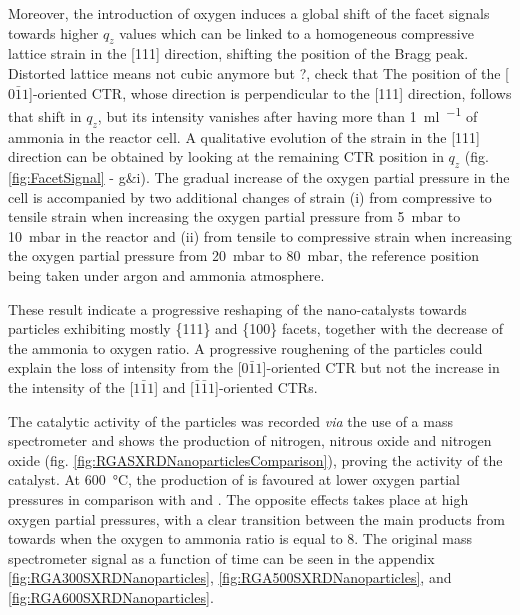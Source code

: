 Moreover, the introduction of oxygen induces a global shift of the facet signals towards higher $q_z$ values which can be linked to a homogeneous compressive lattice strain in the [111] direction, shifting the position of the Bragg peak.
\textcolor{Important}{Distorted lattice means not cubic anymore but ?, check that}
The position of the [$0\bar{1}1$]-oriented CTR, whose direction is perpendicular to the [111] direction, follows that shift in $q_z$, but its intensity vanishes after having more than \qty{1}{\ml\per\min} of ammonia in the reactor cell.
A qualitative evolution of the strain in the [111] direction can be obtained by looking at the remaining CTR position in $q_z$ (fig. \ref{fig:FacetSignal} - g\&i).
The gradual increase of the oxygen partial pressure in the cell is accompanied by two additional changes of strain (i) from compressive to tensile strain when increasing the oxygen partial pressure from \qty{5}{\milli\bar} to \qty{10}{\milli\bar} in the reactor and (ii) from tensile to compressive strain when increasing the oxygen partial pressure from \qty{20}{\milli\bar} to \qty{80}{\milli\bar}, the reference position being taken under argon and ammonia atmosphere.

These result indicate a progressive reshaping of the nano-catalysts towards particles exhibiting mostly \{111\} and \{100\} facets, together with the decrease of the ammonia to oxygen ratio.
A progressive roughening of the particles could explain the loss of intensity from the [$0\bar{1}1$]-oriented CTR but not the increase in the intensity of the [$1\bar{1}1$] and [$\bar{1}\bar{1}1$]-oriented CTRs.

The catalytic activity of the particles was recorded \textit{via} the use of a mass spectrometer and shows the production of nitrogen, nitrous oxide and nitrogen oxide (fig. \ref{fig:RGASXRDNanoparticlesComparison}), proving the activity of the catalyst.
At \qty{600}{\degreeCelsius}, the production of  is favoured at lower oxygen partial pressures in comparison with  and .
The opposite effects takes place at high oxygen partial pressures, with a clear transition between the main products from  towards  when the oxygen to ammonia ratio is equal to 8.
The original mass spectrometer signal as a function of time can be seen in the appendix \ref{fig:RGA300SXRDNanoparticles}, \ref{fig:RGA500SXRDNanoparticles}, and \ref{fig:RGA600SXRDNanoparticles}.

